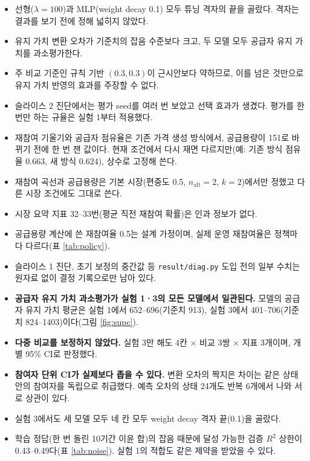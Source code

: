 \documentclass[11pt,a4paper]{article}
\begin{document}
\begin{itemize}[leftmargin=1.5em]
  \item 선형($\lambda=100$)과 MLP(weight decay 0.1) 모두 튜닝 격자의 끝을 골랐다. 격자는 결과를 보기 전에 정해 넓히지 않았다.
  \item 유지 가치 변환 오차가 기준치의 잡음 수준보다 크고, 두 모델 모두 공급자 유지 가치를 과소평가한다.
  \item 주 비교 기준인 규칙 기반 $(0.3,0.3)$이 근시안보다 약하므로, 이를 넘은 것만으로 유지 가치 반영의 효과를 주장할 수 없다.
  \item 슬라이스 2 진단에서는 평가 seed를 여러 번 보았고 선택 효과가 생겼다. 평가를 한 번만 하는 규율은 실험 1부터 적용했다.
  \item 재참여 기울기와 공급자 점유율은 기존 가격 생성 방식에서, 공급용량이 151로 바뀌기 전에 한 번 잰 값이다.
        현재 조건에서 다시 재면 다르지만(예: 기존 방식 점유율 0.663, 새 방식 0.624), 상수로 고정해 쓴다.
  \item 재참여 곡선과 공급용량은 기본 시장(편중도 0.5, $n_{\mathrm{alt}}=2$, $k=2$)에서만 정했고 다른 시장 조건에도 그대로 쓴다.
  \item 시장 요약 지표 32--33번(평균 직전 재참여 확률)은 인과 정보가 없다.
  \item 공급용량 계산에 쓴 재참여율 0.5는 설계 가정이며, 실제 운영 재참여율은 정책마다 다르다(표 \ref{tab:policy}).
  \item 슬라이스 1 진단, 초기 보정의 중간값 등 \texttt{result/diag.py} 도입 전의 일부 수치는 원자료 없이 결정 기록으로만 남아 있다.
  \item \textbf{공급자 유지 가치 과소평가가 실험 1·3의 모든 모델에서 일관된다.}
        모델의 공급자 유지 가치 평균은 실험 1에서 652--696(기준치 913), 실험 3에서 401--706(기준치 824--1403)이다(그림 \ref{fig:supc}).
  \item \textbf{다중 비교를 보정하지 않았다.} 실험 3만 해도 4칸 $\times$ 비교 3쌍 $\times$ 지표 3개이며, 개별 95\% CI로 판정했다.
  \item \textbf{참여자 단위 CI가 실제보다 좁을 수 있다.} 변환 오차의 짝지은 차이는 같은 상태 안의 참여자를 독립으로 취급했다.
        예측 오차의 상태 24개도 반복 6개에서 나와 서로 상관이 있다.
  \item 실험 3에서도 세 모델 모두 네 칸 모두 weight decay 격자 끝(0.1)을 골랐다.
  \item 학습 정답(한 번 돌린 10기간 이윤 합)의 잡음 때문에 달성 가능한 검증 $R^2$ 상한이 0.43--0.49다(표 \ref{tab:noise}). 실험 1의 적합도 같은 제약을 받았을 수 있다.
\end{itemize}
\end{document}
